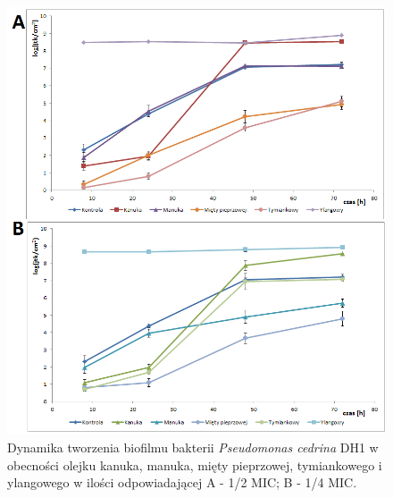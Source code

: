 \documentclass[11pt,a4paper]{report}
\begin{document}
\begin{figure}[!h]
\begin{center}
\includegraphics[scale=0.65]{img/pc-b.png}
\caption{Dynamika tworzenia biofilmu bakterii \textit{Pseudomonas cedrina} DH1 w obecności olejku kanuka, manuka, mięty pieprzowej, tymiankowego i ylangowego w ilości odpowiadającej A - 1/2 MIC; B - 1/4 MIC.}\label{pc-b}
\end{center} 
\end{figure}
\end{document}
